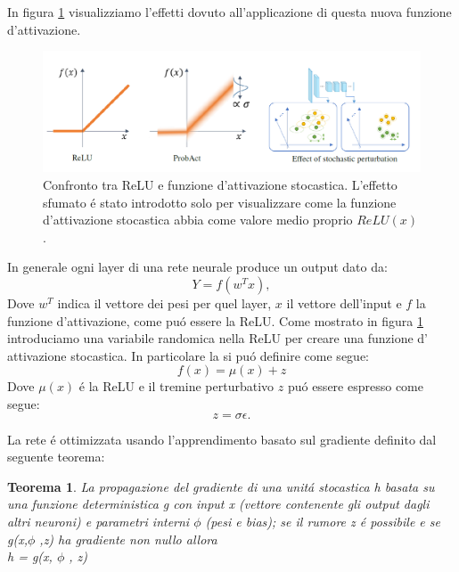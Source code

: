 \documentclass[a4paper,12pt]{report}
\begin{document}
 In figura \ref{ProbActEffectpng} visualizziamo l'effetti dovuto all'applicazione di questa nuova funzione d'attivazione. 
 \begin{figure}[h!]
  \centering
  \includegraphics[scale=0.6]{ProbActEffect.png} 
  \caption{Confronto tra ReLU e funzione d'attivazione stocastica. L'effetto sfumato \'e stato introdotto solo per visualizzare come la funzione d'attivazione stocastica abbia come valore medio proprio $ReLU(x)$.}
  \label{ProbActEffectpng}
 \end{figure}
 
 In generale ogni layer di una rete neurale produce un output dato da:
 \begin{equation} 
  Y = f\left(w^{T} x\right), 
 \end{equation} 
 Dove $w^{T}$ indica il vettore dei pesi per quel layer, $x$ il vettore dell'input e $f$ la funzione d'attivazione, come pu\'o  essere la ReLU. 
 Come mostrato in figura \ref{ProbActEffectpng} introduciamo una variabile randomica nella ReLU per creare una funzione d' attivazione stocastica. 
 In particolare la si pu\'o definire come segue:
 \begin{equation} 
  f\left(x\right) = \mu \left(x\right) + z
 \end{equation} 
 Dove $\mu\left(x\right)$ \'e la ReLU e il tremine perturbativo $z$ pu\'o essere espresso come segue:
 \begin{equation} 
  z = \sigma  \epsilon. 
 \end{equation} 
 
 La rete \'e ottimizzata usando l'apprendimento basato sul gradiente definito dal seguente teorema:
 \newtheorem{teorema}{Teorema}
 
 \begin{teorema} \label{GradienPropth}
  La propagazione del gradiente di una unit\'a stocastica h basata su una funzione deterministica g con input x (vettore contenente gli output dagli altri neuroni) e parametri interni $\phi$ (pesi e bias); se il rumore z \'e possibile e se g(x,$\phi$ ,z) ha gradiente non nullo allora\\
  
  \centering
  h = g(x, $\phi$ , z)
 \end{teorema}
\end{document}
